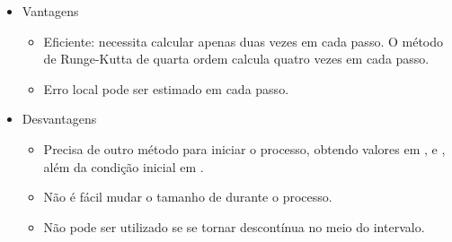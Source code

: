 \begin{itemize}

\item Vantagens

\begin{itemize}

\item Eficiente: necessita calcular  apenas duas vezes em cada passo. O método de Runge-Kutta de quarta ordem calcula  quatro vezes em cada passo.

\item Erro local pode ser estimado em cada passo.

\end{itemize}

\item Desvantagens

\begin{itemize}

\item Precisa de outro método para iniciar o processo, obtendo valores em ,  e , além da condição inicial em .

\item Não é fácil mudar o tamanho de  durante o processo.

\item Não pode ser utilizado se  se tornar descontínua no meio do intervalo.

\end{itemize}

\end{itemize}

